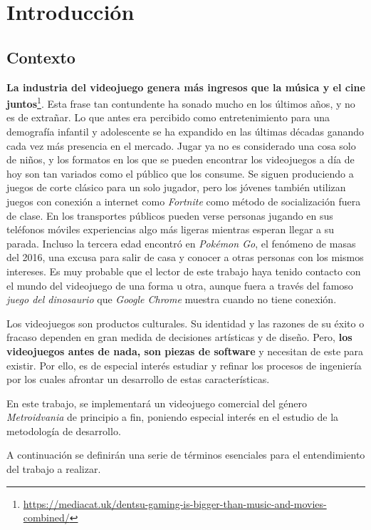 \chapter{Introducción}

\section{Contexto}

\textbf{La industria del videojuego genera más ingresos que la música y el cine juntos}\footnote{\url{https://mediacat.uk/dentsu-gaming-is-bigger-than-music-and-movies-combined/}}. Esta frase tan contundente ha sonado mucho en los últimos años, y no es de extrañar. Lo que antes era percibido como entretenimiento para una demografía infantil y adolescente se ha expandido en las últimas décadas ganando cada vez más presencia en el mercado. Jugar ya no es considerado una cosa solo de niños, y los formatos en los que se pueden encontrar los videojuegos a día de hoy son tan variados como el público que los consume. Se siguen produciendo a juegos de corte clásico para un solo jugador, pero los jóvenes también utilizan juegos con conexión a internet como \textit{Fortnite} como método de socialización fuera de clase. En los transportes públicos pueden verse personas jugando en sus teléfonos móviles experiencias algo más ligeras mientras esperan llegar a su parada. Incluso la tercera edad encontró en \textit{Pokémon Go}, el fenómeno de masas del 2016, una excusa para salir de casa y conocer a otras personas con los mismos intereses. Es muy probable que el lector de este trabajo haya tenido contacto con el mundo del videojuego de una forma u otra, aunque fuera a través del famoso \textit{juego del dinosaurio} que \textit{Google Chrome} muestra cuando no tiene conexión. 

Los videojuegos son productos culturales. Su identidad y las razones de su éxito o fracaso dependen en gran medida de decisiones artísticas y de diseño. Pero, \textbf{los videojuegos antes de nada, son piezas de software} y necesitan de este para existir. Por ello, es de especial interés estudiar y refinar los procesos de ingeniería por los cuales afrontar un desarrollo de estas características. 

En este trabajo, se implementará un videojuego comercial del género \textit{Metroidvania} de principio a fin, poniendo especial interés en el estudio de la metodología de desarrollo.

A continuación se definirán una serie de términos esenciales para el entendimiento del trabajo a realizar.

